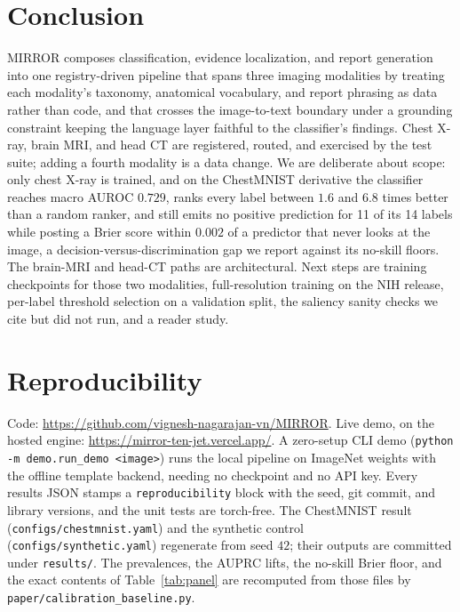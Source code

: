 \documentclass[conference]{IEEEtran}
\newcommand{\code}[1]{\texttt{\small #1}}
\begin{document}
\section{Conclusion}

MIRROR composes classification, evidence localization, and report generation into
one registry-driven pipeline that spans three imaging modalities by treating each
modality's taxonomy, anatomical vocabulary, and report phrasing as data rather than
code, and that crosses the image-to-text boundary under a grounding constraint
keeping the language layer faithful to the classifier's findings. Chest X-ray, brain
MRI, and head CT are registered, routed, and exercised by the test suite; adding a
fourth modality is a data change. We are deliberate about scope: only chest X-ray is
trained, and on the ChestMNIST derivative the classifier reaches macro AUROC $0.729$,
ranks every label between $1.6$ and $6.8$ times better than a random ranker, and
still emits no positive prediction for 11 of its 14 labels while posting a Brier
score within $0.002$ of a predictor that never looks at the image, a
decision-versus-discrimination gap we report against its no-skill floors. The
brain-MRI and head-CT paths are architectural. Next steps are training checkpoints
for those two modalities, full-resolution training on the NIH release, per-label
threshold selection on a validation split, the saliency sanity checks we cite but
did not run, and a reader study.

\section*{Reproducibility}
\footnotesize
Code: \url{https://github.com/vignesh-nagarajan-vn/MIRROR}. Live demo, on the hosted
engine: \url{https://mirror-ten-jet.vercel.app/}. A zero-setup CLI demo
(\code{python -m demo.run\_demo <image>}) runs the local pipeline on ImageNet weights
with the offline template backend, needing no checkpoint and no API key. Every
results JSON stamps a \code{reproducibility} block with the seed, git commit, and
library versions, and the unit tests are torch-free. The ChestMNIST result
(\code{configs/chestmnist.yaml}) and the synthetic control
(\code{configs/synthetic.yaml}) regenerate from seed $42$; their outputs are
committed under \code{results/}. The prevalences, the AUPRC lifts, the no-skill Brier
floor, and the exact contents of Table~\ref{tab:panel} are recomputed from those
files by \code{paper/calibration\_baseline.py}.
\end{document}
